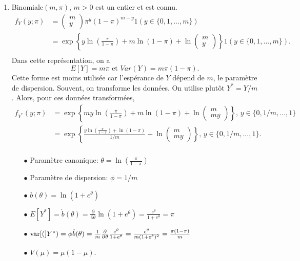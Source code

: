 \begin{solution}{2.1}
\begin{enumerate}
\item Binomiale$(m, \pi)$, $m>0$ est un entier et est connu.
\begin{align*}
f_{Y}(y;\pi)&=\begin{pmatrix} m\\y\end{pmatrix}\pi^{y}(1-\pi)^{m-y}1(y \in \{0,1,...,m\})\\
&=\exp\left\{y\ln\left(\frac{\pi}{1-\pi}\right)+m\ln(1-\pi)+\ln\begin{pmatrix} m\\y\end{pmatrix}\right\}1(y \in \{0,1,...,m\}).\\
\end{align*}
Dans cette représentation, on a $$E[Y]=m\pi \mbox{ et } Var(Y)=m\pi(1-\pi).$$ Cette forme est moins utilisée car l'espérance de $Y$ dépend de $m$, le paramètre de dispersion. Souvent, on transforme les données. On utilise plutôt $Y^{*}=Y/m$. Alors, pour ces données transformées,
\begin{align*}
f_{Y^{*}}(y;\pi)&=\exp\left\{my\ln\left(\frac{\pi}{1-\pi}\right)+m\ln(1-\pi)+\ln\begin{pmatrix} m\\my\end{pmatrix}\right\}, \,y \in \{0,1/m,...,1\}\\
&=\exp\left\{\frac{y\ln\left(\frac{\pi}{1-\pi}\right)+\ln(1-\pi)}{1/m}+\ln\begin{pmatrix} m\\my\end{pmatrix}\right\}, \,y \in \{0,1/m,...,1\}.\\
\end{align*}
\begin{itemize}
\item[$\bullet$] Paramètre canonique: $\theta=\ln\left(\frac{\pi}{1-\pi}\right)$
\item[$\bullet$] Paramètre de dispersion:  $\phi=1/m$
\item[$\bullet$] $b(\theta)=\ln(1+e^{\theta})$
\item[$\bullet$] $E[Y^*]=\dot{b}(\theta)=\frac{\partial}{\partial\theta}\ln(1+e^{\theta})=\frac{e^{\theta}}{1+e^\theta}=\pi$
\item[$\bullet$] $\mathrm{var} [ ( ]Y^*)=\phi\ddot{b}(\theta)=\frac{1}{m}\frac{\partial}{\partial\theta}\frac{e^{\theta}}{1+e^\theta}=\frac{e^\theta}{m(1+e^\theta)^2}=\frac{\pi(1-\pi)}{m}$
\item[$\bullet$] $V(\mu)=\mu(1-\mu)$.
\end{itemize}


\end{enumerate}
\end{solution}
